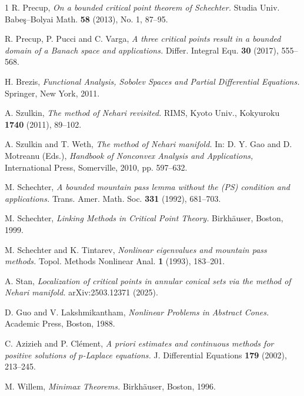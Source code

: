 \documentclass{birkjour}
\theoremstyle{definition}
\theoremstyle{remark}
\numberwithin{equation}{section}
\begin{document}
\begin{thebibliography}{1}
 R. Precup,
\textit{On a bounded critical point theorem of Schechter.}
Studia Univ. Babe\c{s}--Bolyai Math. \textbf{58} (2013), No. 1, 87--95.

 R. Precup, P. Pucci and C. Varga,
\textit{A three critical points result in a bounded domain of a Banach space and applications.}
Differ. Integral Equ. \textbf{30} (2017), 555--568.

 H. Brezis,
\textit{Functional Analysis, Sobolev Spaces and Partial Differential Equations.}
Springer, New York, 2011.

 A. Szulkin,
\textit{The method of Nehari revisited.}
RIMS, Kyoto Univ., Kokyuroku \textbf{1740} (2011), 89--102.

 A. Szulkin and T. Weth,
\textit{The method of Nehari manifold.}
In: D. Y. Gao and D. Motreanu (Eds.), \textit{Handbook of Nonconvex Analysis and Applications,}
International Press, Somerville, 2010, pp. 597--632.

 M. Schechter,
\textit{A bounded mountain pass lemma without the (PS) condition and applications.}
Trans. Amer. Math. Soc. \textbf{331} (1992), 681--703.

 M. Schechter,
\textit{Linking Methods in Critical Point Theory.}
Birkh\"{a}user, Boston, 1999.

 M. Schechter and K. Tintarev,
\textit{Nonlinear eigenvalues and mountain pass methods.}
Topol. Methods Nonlinear Anal. \textbf{1} (1993), 183--201.

 A. Stan,
\textit{Localization of critical points in annular conical sets via the method of Nehari manifold.}
arXiv:2503.12371 (2025).

 D. Guo and V. Lakshmikantham,
\textit{Nonlinear Problems in Abstract Cones.}
Academic Press, Boston, 1988.

 C. Azizieh and P. Cl\'ement,
\textit{A priori estimates and continuous methods for positive solutions of $p$-Laplace equations.}
J. Differential Equations \textbf{179} (2002), 213--245.

 M. Willem,
\textit{Minimax Theorems.}
Birkh\"{a}user, Boston, 1996.

\end{thebibliography}

\end{document}
